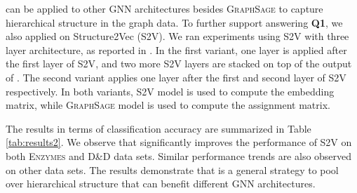 

\label{sec:s2v}
\name can be applied to other GNN architectures besides \textsc{GraphSage} to capture hierarchical structure in the graph data.
To further support answering {\bf Q1}, we also applied \name on Structure2Vec (\textsc{S2V}). 
We ran experiments using \textsc{S2V} with three layer architecture, as reported in \cite{dai2016discriminative}.
In the first variant, one \name layer is applied after the first layer of \textsc{S2V}, and two more \textsc{S2V} layers are stacked on top of the output of \name. The second variant applies one \name layer after the first and second layer of \textsc{S2V} respectively. 
In both variants, \textsc{S2V} model is used to compute the embedding matrix, while \textsc{GraphSage} model is used to compute the assignment matrix.


\begin{table}[htbp]\centering		
\caption{Accuracy results of applying \name to \textsc{S2V}.}
\label{tab:results2}
\end{table}

The results in terms of classification accuracy are summarized in Table \ref{tab:results2}.
We observe that \name significantly improves the performance of S2V on both \textsc{Enzymes} and \textsc{D\&D} data sets. Similar performance trends are also observed on other data sets.
The results demonstrate that \name is a general strategy to pool over hierarchical structure that can benefit different GNN architectures.


